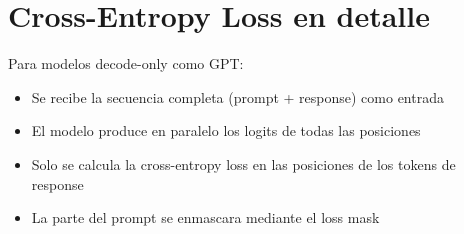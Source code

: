 \section{Cross-Entropy Loss en detalle}
Para modelos decode-only como GPT:
\begin{itemize}
  \item Se recibe la secuencia completa (prompt + response) como entrada
  \item El modelo produce en paralelo los logits de todas las posiciones
  \item Solo se calcula la cross-entropy loss en las posiciones de los tokens de response
  \item La parte del prompt se enmascara mediante el loss mask
\end{itemize}

